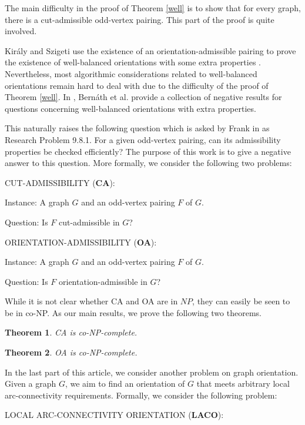 \documentclass[a4paper,12pt,makeidx]{article}
\newtheorem{theo}{Theorem}
\begin{document}
The main difficulty in the proof of Theorem \ref{well} is to show that for every graph, there is a cut-admissible odd-vertex pairing. This part of the proof is quite involved.

Kir\'aly and Szigeti use the existence of an orientation-admissible pairing to prove the existence of well-balanced orientations with some extra properties \cite{ks}. Nevertheless, most algorithmic considerations related to well-balanced orientations remain hard to deal with due to the difficulty of the proof of Theorem \ref{well}. In \cite{bikks}, Bern\'ath et al. provide a collection of negative results for questions concerning well-balanced orientations with extra properties.

This naturally raises the following question which is asked by Frank in \cite{book} as Research Problem 9.8.1. For a given odd-vertex pairing, can its admissibility properties be checked efficiently? The purpose of this work is to give a negative answer to this question. More formally, we consider the following two problems:

\bigskip
\noindent  CUT-ADMISSIBILITY ({\bf CA}):

\smallskip
\noindent Instance: A graph $G$ and an odd-vertex pairing $F$ of $G$.

\smallskip
\noindent Question: Is $F$ cut-admissible in $G$?


\bigskip
\noindent  ORIENTATION-ADMISSIBILITY ({\bf OA}):

\smallskip
\noindent Instance: A graph $G$ and an odd-vertex pairing $F$ of $G$.

\smallskip
\noindent Question: Is $F$ orientation-admissible in $G$?
\bigskip

While it is not clear whether CA and OA are in $NP$, they can easily be seen to be in co-NP. As our main results, we prove the following two theorems.

\begin{theo}\label{ca}
CA is co-NP-complete.
\end{theo}

\begin{theo}\label{oa}
OA is co-NP-complete.
\end{theo}

In the last part of this article, we consider another problem on graph orientation. Given a graph $G$, we aim to find an orientation of $G$ that meets arbitrary local arc-connectivity requirements. Formally, we consider the following problem:

\bigskip
\noindent LOCAL ARC-CONNECTIVITY ORIENTATION ({\bf LACO}):
\end{document}
